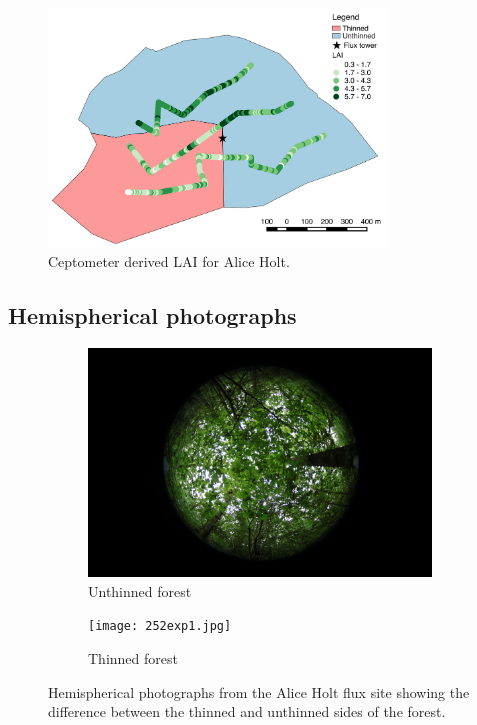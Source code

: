 \documentclass[11pt]{article}
\begin{document}
\begin{figure}[ht]
    \centering
    \includegraphics[width=0.8\textwidth]{lai_cept.pdf}
    \caption{Ceptometer derived LAI for Alice Holt.} \label{fig:cept_lai}
\end{figure}

\subsection{Hemispherical photographs}

\begin{figure}[ht]
\centering
\begin{subfigure}{.5\textwidth}
  \centering
  \includegraphics[width=.9\linewidth]{043exp2.jpg}
  \caption{Unthinned forest}
  \label{fig:sub1}
\end{subfigure}%
\begin{subfigure}{.5\textwidth}
  \centering
  \texttt{[image: 252exp1.jpg]}
  \caption{Thinned forest}
  \label{fig:sub2}
\end{subfigure}
\caption{Hemispherical photographs from the Alice Holt flux site showing the difference between the thinned and unthinned sides of the forest.}
\label{fig:hemiphotos}
\end{figure}
\end{document}
